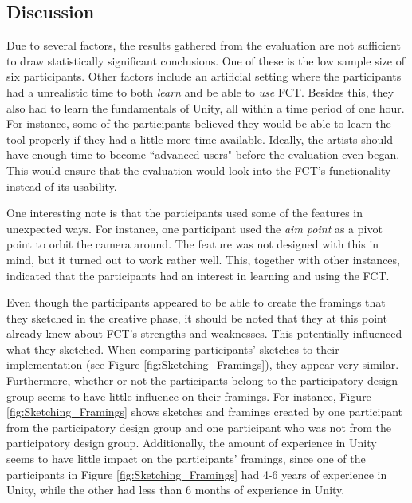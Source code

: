 \subsection{Discussion}


Due to several factors, the results gathered from the evaluation are not sufficient to draw statistically significant conclusions. One of these is the low sample size of six participants. Other factors include an artificial setting where the participants had a unrealistic time to both \textit{learn} and be able to \textit{use} FCT. Besides this, they also had to learn the fundamentals of Unity, all within a time period of one hour. For instance, some of the participants believed they would be able to learn the tool properly if they had a little more time available. Ideally, the artists should have enough time to become ``advanced users" before the evaluation even began. This would ensure that the evaluation would look into the FCT's functionality instead of its usability.

One interesting note is that the participants used some of the features in unexpected ways. For instance, one participant used the \textit{aim point} as a pivot point to orbit the camera around. The feature was not designed with this in mind, but it turned out to work rather well. This, together with other instances, indicated that the participants had an interest in learning and using the FCT.

Even though the participants appeared to be able to create the framings that they sketched in the creative phase, it should be noted that they at this point already knew about FCT's strengths and weaknesses. This potentially influenced what they sketched.
When comparing participants' sketches to their implementation (see Figure \ref{fig:Sketching_Framings}), they appear very similar. 
Furthermore, whether or not the participants belong to the participatory design group seems to have little influence on their framings. For instance, Figure \ref{fig:Sketching_Framings} shows sketches and framings created by one participant from the participatory design group and one participant who was not from the participatory design group.
Additionally, the amount of experience in Unity seems to have little impact on the participants' framings, since one of the participants in Figure \ref{fig:Sketching_Framings} had 4-6 years of experience in Unity, while the other had less than 6 months of experience in Unity.

